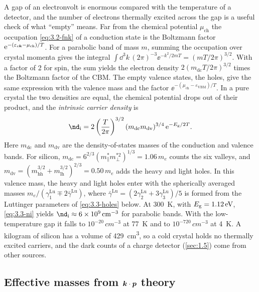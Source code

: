 A gap of an electronvolt is enormous compared with the temperature of a detector, and the number of electrons thermally excited across the gap is a useful check of what ``empty'' means. Far from the chemical potential $\mu_{\mathrm{ch}}$ the occupation \cref{eq:3.2-fnk} of a conduction state is the Boltzmann factor $\mathrm{e}^{-(\varepsilon_{c\bm{k}} - \mu_{\mathrm{ch}})/T}$. For a parabolic band of mass $m$, summing the occupation over crystal momenta gives the integral $\int\dd^3k\,(2\pi)^{-3}\ee^{-k^2/2mT} = (mT/2\pi)^{3/2}$. With a factor of 2 for spin, the sum yields the electron density $2(m_{\mathrm{dc}}T/2\pi)^{3/2}$ times the Boltzmann factor of the CBM. The empty valence states, the holes, give the same expression with the valence mass and the factor $\ee^{-(\mu_{\mathrm{ch}} - \varepsilon_{\mathrm{VBM}})/T}$. In a pure crystal the two densities are equal, the chemical potential drops out of their product, and the \emph{intrinsic carrier density} is~\cite[Chap.~28]{ashcroft1976solid}
\begin{equation}
  \nd_{\mathrm{i}} = 2\left(\frac{T}{2\pi}\right)^{3/2}(m_{\mathrm{dc}}m_{\mathrm{dv}})^{3/4}\,\ee^{-\Eg/2T} .
  \label{eq:3.3-ni}
\end{equation}
Here $m_{\mathrm{dc}}$ and $m_{\mathrm{dv}}$ are the density-of-states masses of the conduction and valence bands. For silicon, $m_{\mathrm{dc}} = 6^{2/3}(m^*_\parallel m^{*2}_\perp)^{1/3} = 1.06\,m_e$ counts the six valleys, and $m_{\mathrm{dv}} = (m_{\mathrm{hh}}^{3/2} + m_{\mathrm{lh}}^{3/2})^{2/3} = 0.50\,m_e$ adds the heavy and light holes. In this valence mass, the heavy and light holes enter with the spherically averaged masses $m_e/(\gamma^{\mathrm{Lu}}_1 \mp 2\bar\gamma^{\mathrm{Lu}})$, where $\bar\gamma^{\mathrm{Lu}} = (2\gamma^{\mathrm{Lu}}_2 + 3\gamma^{\mathrm{Lu}}_3)/5$ is formed from the Luttinger parameters of \cref{eq:3.3-holes} below. At \SI{300}{K}, with $E_{\mathrm{g}} = \SI{1.12}{eV}$, \cref{eq:3.3-ni} yields $\nd_{\mathrm{i}} \approx \SI{6e9}{cm^{-3}}$ for parabolic bands. With the low-temperature gap it falls to $10^{-20}\,\si{cm^{-3}}$ at \SI{77}{K} and to $10^{-720}\,\si{cm^{-3}}$ at \SI{4}{K}. A kilogram of silicon has a volume of \SI{429}{cm^3}, so a cold crystal holds no thermally excited carriers, and the dark counts of a charge detector (\cref{sec:1.5}) come from other sources.

\subsection{Effective masses from \texorpdfstring{$\bm{k}\cdot\bm{p}$}{k.p} theory}

